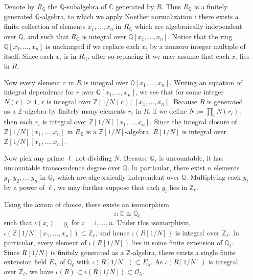 Denote by \(R_{\mathbb{Q}}\) the \(\mathbb{Q}\)-subalgebra of \(\mathbb{C}\)
generated by \(R\). Thus \(R_{\mathbb{Q}}\) is a finitely generated
\(\mathbb{Q}\)-algebra, to which we apply Noether normalization
\cite[2.5]{AK}: there exists a finite collection of elements
\(x_1,\ldots,x_n\) in \(R_{\mathbb{Q}}\) which are algebraically independent
over \(\mathbb{Q}\), and such that \(R_{\mathbb{Q}}\) is integral over
\(\mathbb{Q}[x_1,\ldots,x_n]\). Notice that the ring
\(\mathbb{Q}[x_1,\ldots,x_n]\) is unchanged if we replace each \(x_i\) by a
nonzero integer multiple of itself. Since each \(x_i\) is in
\(R_{\mathbb{Q}}\), after so replacing it we may assume that each \(x_i\) lies
in \(R\).

Now every element \(r\) in \(R\) is integral over
\(\mathbb{Q}[x_1,\ldots,x_n]\). Writing an equation of integral dependence for
\(r\) over \(\mathbb{Q}[x_1,\ldots,x_n]\), we see that for some integer
\(N(r)\geq 1\), \(r\) is integral over
\(\mathbb{Z}[1/N(r)][x_1,\ldots,x_n]\). Because \(R\) is generated as a
\(\mathbb{Z}\)-algebra by finitely many elements \(r_i\) in \(R\), if we
define \(N:=\prod_i N(r_i)\), then each \(r_i\) is integral over
\(\mathbb{Z}[1/N][x_1,\ldots,x_n]\). Since the integral closure of
\(\mathbb{Z}[1/N][x_1,\ldots,x_n]\) in \(R_{\mathbb{Q}}\) is a
\(\mathbb{Z}[1/N]\)-algebra, \(R[1/N]\) is integral over
\(\mathbb{Z}[1/N][x_1,\ldots,x_n]\).

Now pick any prime \(\ell\) not dividing \(N\). Because
\(\mathbb{Q}_\ell\) is uncountable, it has uncountable transcendence degree
over \(\mathbb{Q}\). In particular, there exist \(n\) elements
\(y_1,y_2,\ldots,y_n\) in \(\mathbb{Q}_\ell\) which are algebraically
independent over \(\mathbb{Q}\). Multiplying each \(y_i\) by a power of
\(\ell\), we may further suppose that each \(y_i\) lies in
\(\mathbb{Z}_\ell\).

Using the axiom of choice, there exists an isomorphism
\[
  \iota:\mathbb{C}\cong\overline{\mathbb{Q}}_\ell
\]
such that \(\iota(x_i)=y_i\) for \(i=1,\ldots,n\). Under this isomorphism,
\(\iota(\mathbb{Z}[1/N][x_1,\ldots,x_n])\subset\mathbb{Z}_\ell\), and hence
\(\iota(R[1/N])\) is integral over \(\mathbb{Z}_\ell\). In particular, every
element of \(\iota(R[1/N])\) lies in some finite extension of
\(\mathbb{Q}_\ell\). Since \(R[1/N]\) is finitely generated as a
\(\mathbb{Z}\)-algebra, there exists a single finite extension field
\(E_\lambda\) of \(\mathbb{Q}_\ell\) with
\(\iota(R[1/N])\subset E_\lambda\). As \(\iota(R[1/N])\) is integral over
\(\mathbb{Z}_\ell\), we have
\(\iota(R)\subset\iota(R[1/N])\subset\mathcal{O}_\lambda\).

